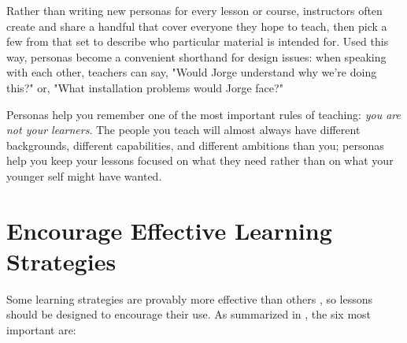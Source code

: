 \documentclass[10pt,letterpaper]{article}
\newcommand{\rulemajor}[1]{\section{#1}}
\begin{document}
Rather than writing new personas for every lesson or course, instructors often
create and share a handful that cover everyone they hope to teach, then pick a
few from that set to describe who particular material is intended for.  Used
this way, personas become a convenient shorthand for design issues: when
speaking with each other, teachers can say, "Would Jorge understand why we're
doing this?" or, "What installation problems would Jorge face?"

Personas help you remember one of the most important rules of teaching:
\emph{you are not your learners}.  The people you teach will almost always have
different backgrounds, different capabilities, and different ambitions than you;
personas help you keep your lessons focused on what they need rather than on
what your younger self might have wanted.

\rulemajor{Encourage Effective Learning Strategies}

Some learning strategies are provably more effective than others
\cite{Rohr2015,Kang2016,Miya2018}, so lessons should be designed to encourage
their use.  As summarized in \cite{Wein2018a,Wein2018b}, the six most important
are:
\end{document}

